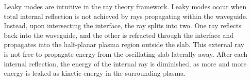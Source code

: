 	Leaky modes are intuitive in the ray theory framework. Leaky modes occur when total internal reflection is not achieved by rays propagating within the waveguide. Instead, upon intersecting the interface, the ray splits into two. One ray reflects back into the waveguide, and the other is refracted through the interface and propagates into the half-planar plasma region outside the slab. This external ray is not free to propagate energy from the oscillating slab laterally away. After each internal reflection, the energy of the internal ray is diminished, as more and more energy is leaked as kinetic energy in the surrounding plasma.
	
	
	
	
	
	
	